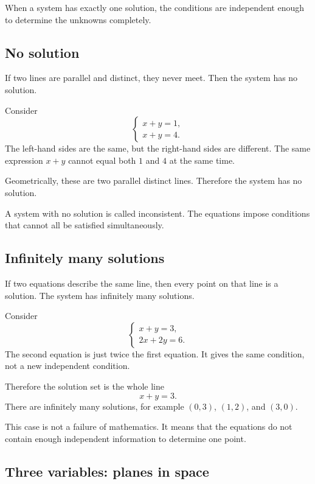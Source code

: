 When a system has exactly one solution, the conditions are independent enough to determine the unknowns completely.

\subsection*{No solution}

If two lines are parallel and distinct, they never meet. Then the system has no solution.

\begin{examplebox}
Consider
\[
\begin{cases}
x+y=1,\\
x+y=4.
\end{cases}
\]
The left-hand sides are the same, but the right-hand sides are different. The same expression \(x+y\) cannot equal both \(1\) and \(4\) at the same time.

Geometrically, these are two parallel distinct lines. Therefore the system has no solution.
\end{examplebox}

A system with no solution is called inconsistent. The equations impose conditions that cannot all be satisfied simultaneously.

\subsection*{Infinitely many solutions}

If two equations describe the same line, then every point on that line is a solution. The system has infinitely many solutions.

\begin{examplebox}
Consider
\[
\begin{cases}
x+y=3,\\
2x+2y=6.
\end{cases}
\]
The second equation is just twice the first equation. It gives the same condition, not a new independent condition.

Therefore the solution set is the whole line
\[
x+y=3.
\]
There are infinitely many solutions, for example \((0,3)\), \((1,2)\), and \((3,0)\).
\end{examplebox}

This case is not a failure of mathematics. It means that the equations do not contain enough independent information to determine one point.

\subsection*{Three variables: planes in space}

